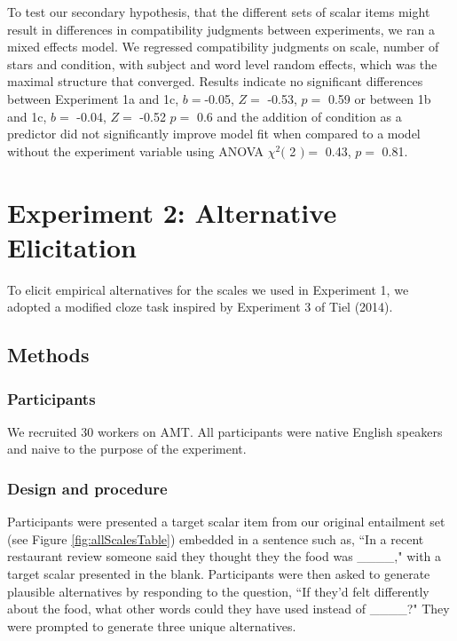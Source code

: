 \documentclass[10pt, letterpaper]{article}
\begin{document}
To test our secondary hypothesis, that the different sets of scalar
items might result in differences in compatibility judgments between
experiments, we ran a mixed effects model. We regressed compatibility
judgments on scale, number of stars and condition, with subject and word
level random effects, which was the maximal structure that converged.
Results indicate no significant differences between Experiment 1a and
1c, \(b =\)-0.05, \(Z =\) -0.53, \(p =\) 0.59 or between 1b and 1c,
\(b =\) -0.04, \(Z =\) -0.52 \(p =\) 0.6 and the addition of condition
as a predictor did not significantly improve model fit when compared to
a model without the experiment variable using ANOVA \(\chi^2(\) 2
\() =\) 0.43, \(p =\) 0.81.

\section{Experiment 2: Alternative
Elicitation}\label{experiment-2-alternative-elicitation}

To elicit empirical alternatives for the scales we used in Experiment 1,
we adopted a modified cloze task inspired by Experiment 3 of Tiel
(2014).

\subsection{Methods}\label{methods-1}

\subsubsection{Participants}\label{participants-1}

We recruited 30 workers on AMT. All participants were native English
speakers and naive to the purpose of the experiment.

\subsubsection{Design and procedure}\label{design-and-procedure-1}

Participants were presented a target scalar item from our original
entailment set (see Figure \ref{fig:allScalesTable}) embedded in a
sentence such as, ``In a recent restaurant review someone said they
thought they the food was \_\_\_\_," with a target scalar presented in
the blank. Participants were then asked to generate plausible
alternatives by responding to the question, ``If they'd felt differently
about the food, what other words could they have used instead of
\_\_\_\_?" They were prompted to generate three unique alternatives.
\end{document}
